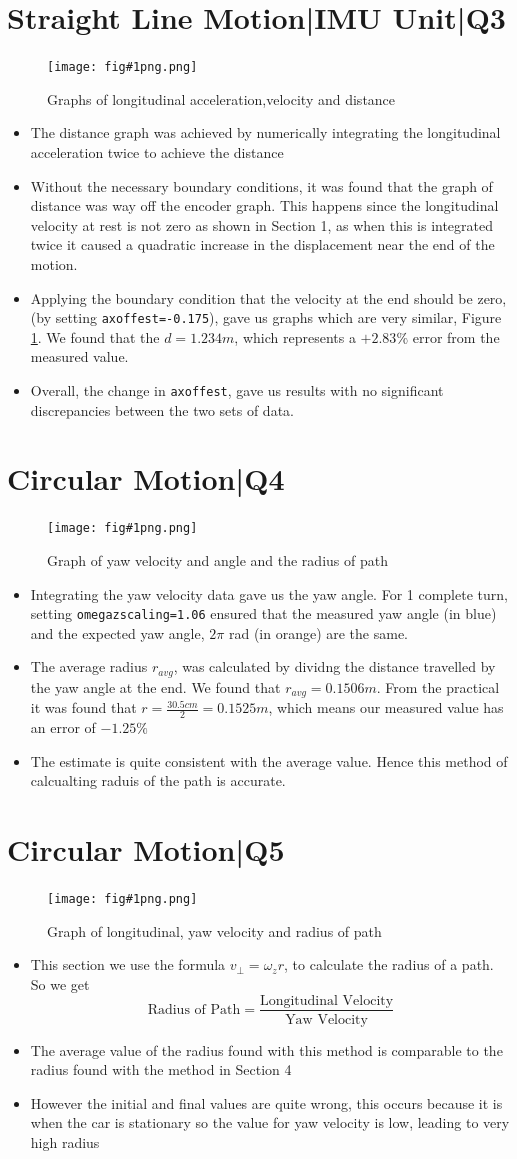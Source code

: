 \documentclass{article}
\newcommand{\main}[4]{
    \section{#2}
    
    \begin{figure}[h]
        \begin{center}
        \texttt{[image: fig\#1png.png]} 
         \caption{#3}
        \label{fig:#1}      
        \end{center}
    
    \end{figure}
    
    #4
    \newpage
}
\newcommand{\bul}[1]{\begin{itemize}
    #1
\end{itemize}}
\begin{document}
\main{3}{Straight Line Motion|IMU Unit|Q3}{Graphs of longitudinal acceleration,velocity and distance}{

\bul{
\item The distance graph was achieved by numerically integrating the longitudinal acceleration twice to achieve the distance
\item Without the necessary boundary conditions, it was found that the graph of distance was way off the encoder graph. This happens since the longitudinal velocity at rest is not zero as shown in Section 1, as when this is integrated twice it caused a quadratic increase in the displacement near the end of the motion.
\item Applying the boundary condition that the velocity at the end should be zero, (by setting \texttt{axoffest=-0.175}), gave us graphs which are very similar, Figure \ref{fig:3}. We found that the $d=1.234m$, which represents a $+2.83\%$ error from the measured value.
\item Overall, the change in \texttt{axoffest}, gave us results with no significant discrepancies between the two sets of data.
}

}
\main{4}{Circular Motion|Q4}{Graph of yaw velocity and angle and the radius of path}{
\bul{
\item Integrating the yaw velocity data gave us the yaw angle. For 1 complete turn, setting \texttt{omegazscaling=1.06}
ensured that the measured yaw angle (in blue) and the expected yaw angle, $2\pi$ rad (in orange) are the same. 
\item The average radius $r_{avg}$, was calculated by dividng the distance travelled by the yaw angle at the end. We found that $r_{avg} = 0.1506m$. From the practical it was found that $r=\frac{30.5cm}{2}=0.1525m$, which means our measured value has an error of $-1.25\%$
\item The estimate is quite consistent with the average value. Hence this method of calcualting raduis of the path is accurate.
}
}
\main{5}{Circular Motion|Q5}{Graph of longitudinal, yaw velocity and radius of path}{
\bul{
\item This section we use the formula $v_{\perp}=\omega_z r$, to calculate the radius of a path. So we get $$\textrm{Radius of Path}=\frac{\textrm{Longitudinal Velocity}}{\textrm{Yaw Velocity}}$$


\item The average value of the radius found with this method is comparable to the radius found with the method in Section 4
\item However the initial and final values are quite wrong, this occurs because it is when the car is stationary so the value for yaw velocity is low, leading to very high radius
}

}
\end{document}

